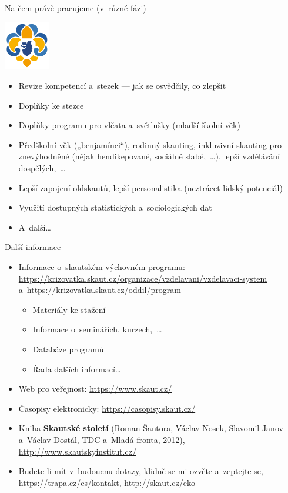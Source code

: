 \documentclass[compress, ucs, xelatex, xcolor=dvipsnames, print,
  hyperref={
    bookmarks=true,
    unicode=true,
    colorlinks=true,
    plainpages=false,
    pdfkeywords={Skaut, Junak, Skauting, Vychovna metoda},
    linkcolor=Black,
    anchorcolor=Black,
    citecolor=OliveGreen,
    filecolor=OliveGreen,
    menucolor=Black,
    urlcolor=OliveGreen,
    pdftex}
  ]{beamer}
\begin{document}
\begin{frame}{Na čem právě pracujeme (v~různé fázi)}
  \begin{center}
    \includegraphics[width=2cm]{lilie.png}
  \end{center}
  \begin{itemize}
    \item Revize kompetencí a~stezek --- jak se osvědčily, co zlepšit
    \item Doplňky ke stezce
    \item Doplňky programu pro vlčata a~světlušky (mladší školní věk)
    \item Předškolní věk („benjamínci“), rodinný skauting, inkluzivní skauting pro znevýhodněné (nějak hendikepované, sociálně slabé,~\ldots), lepší vzdělávání dospělých,~\ldots
    \item Lepší zapojení oldskautů, lepší personalistika (neztrácet lidský potenciál)
    \item Využití dostupných statistických a~sociologických dat
    \item A~další\ldots
  \end{itemize}
\end{frame}

\begin{frame}{Další informace}
  \begin{itemize}
    \item Informace o~skautském výchovném programu: \url{https://krizovatka.skaut.cz/organizace/vzdelavani/vzdelavaci-system} a~\url{https://krizovatka.skaut.cz/oddil/program}
    \begin{itemize}
      \item Materiály ke stažení
      \item Informace o~seminářích, kurzech,~\ldots
      \item Databáze programů
      \item Řada dalších informací\ldots
    \end{itemize}
    \item Web pro veřejnost: \url{https://www.skaut.cz/}
    \item Časopisy elektronicky: \url{https://casopisy.skaut.cz/}
    \item Kniha \textbf{Skautské století} (Roman Šantora, Václav Nosek, Slavomil Janov a~Václav Dostál, TDC a~Mladá fronta, 2012), \url{http://www.skautskyinstitut.cz/}
    \item Budete-li mít v~budoucnu dotazy, klidně se mi ozvěte a~zeptejte se, \url{https://trapa.cz/cs/kontakt}, \href{https://krizovatka.skaut.cz/organizace/ustredi/odbory/ekoodbor}{http://skaut.cz/eko}
  \end{itemize}
\end{frame}
\end{document}
